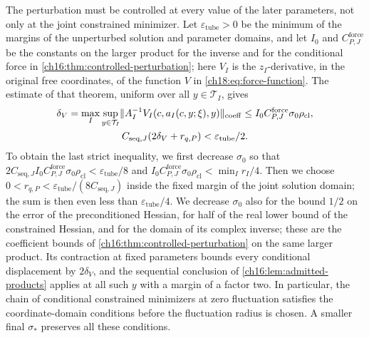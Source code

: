 The perturbation must be controlled at every value of the later parameters, not only at the joint constrained minimizer. Let $\varepsilon_{\mathrm{tube}}>0$ be the minimum of the margins of the unperturbed solution and parameter domains, and let $I_0$ and $C_{P,J}^{\mathrm{force}}$ be the constants on the larger product for the inverse and for the conditional force in \cref{ch16:thm:controlled-perturbation}; here $V_I$ is the $z_I$-derivative, in the original free coordinates, of the function $V$ in \eqref{ch18:eq:force-function}. The estimate of that theorem, uniform over all $y\in\mathcal T_I$, gives
\begin{equation}\label{ch20:eq:conditional-force-gate}
 \begin{gathered}
 \delta_V=\max_I\sup_{y\in\mathcal T_I}\lVert A_I^{-1}V_I(c,a_I(c,y;\xi),y)\rVert_{\mathrm{coeff}}\le I_0C_{P,J}^{\mathrm{force}}\sigma_0\rho_{\mathrm{cl}},\\
 C_{\mathrm{seq},J}(2\delta_V+r_{q,P})<\varepsilon_{\mathrm{tube}}/2.
 \end{gathered}
\end{equation}
To obtain the last strict inequality, we first decrease $\sigma_0$ so that $2C_{\mathrm{seq},J}I_0C_{P,J}^{\mathrm{force}}\sigma_0\rho_{\mathrm{cl}}<\varepsilon_{\mathrm{tube}}/8$ and $I_0C_{P,J}^{\mathrm{force}}\sigma_0\rho_{\mathrm{cl}}<\min_Ir_I/4$. Then we choose $0<r_{q,P}<\varepsilon_{\mathrm{tube}}/(8C_{\mathrm{seq},J})$ inside the fixed margin of the joint solution domain; the sum is then even less than $\varepsilon_{\mathrm{tube}}/4$. We decrease $\sigma_0$ also for the bound $1/2$ on the error of the preconditioned Hessian, for half of the real lower bound of the constrained Hessian, and for the domain of its complex inverse; these are the coefficient bounds of \cref{ch16:thm:controlled-perturbation} on the same larger product. Its contraction at fixed parameters bounds every conditional displacement by $2\delta_V$, and the sequential conclusion of \cref{ch16:lem:admitted-products} applies at all such $y$ with a margin of a factor two. In particular, the chain of conditional constrained minimizers at zero fluctuation satisfies the coordinate-domain conditions before the fluctuation radius is chosen. A smaller final $\sigma_*$ preserves all these conditions.

